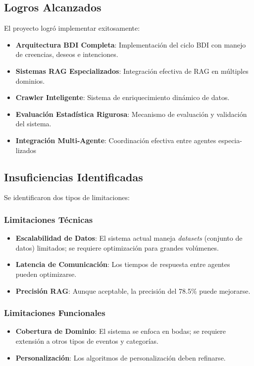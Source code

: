 \documentclass[runningheads,a4paper]{llncs}
\begin{document}
\subsection{Logros Alcanzados}

El proyecto logró implementar exitosamente:

\begin{itemize}
    \item \textbf{Arquitectura BDI Completa}: Implementación del ciclo BDI con manejo de creencias, deseos e intenciones.
    \item \textbf{Sistemas RAG Especializados}: Integración efectiva de RAG en múltiples dominios.
    \item \textbf{Crawler Inteligente}: Sistema de enriquecimiento dinámico de datos.
    \item \textbf{Evaluación Estadística Rigurosa}: Mecanismo de evaluación y validación del sistema.
    \item \textbf{Integración Multi-Agente}: Coordinación efectiva entre agentes especia-lizados
\end{itemize}

\subsection{Insuficiencias Identificadas}

Se identificaron dos tipos de limitaciones:

\subsubsection{Limitaciones Técnicas}
\begin{itemize}
    \item \textbf{Escalabilidad de Datos}: El sistema actual maneja \textit{datasets} (conjunto de datos)
    limitados; se requiere optimización para grandes volúmenes.
    \item \textbf{Latencia de Comunicación}: Los tiempos de respuesta entre agentes pueden optimizarse.
    \item \textbf{Precisión RAG}: Aunque aceptable, la precisión del 78.5\% puede mejorarse.
\end{itemize}

\subsubsection{Limitaciones Funcionales}
\begin{itemize}
    \item \textbf{Cobertura de Dominio}: El sistema se enfoca en bodas; se requiere extensión a otros tipos de eventos y 
    categorías.
    \item \textbf{Personalización}: Los algoritmos de personalización deben refinarse.
\end{itemize}
\end{document}
